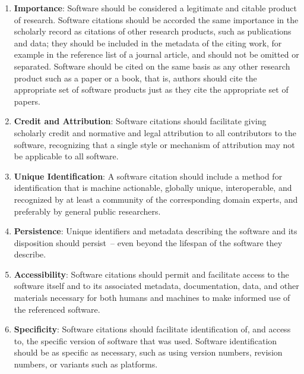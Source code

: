 \documentclass[11pt, oneside]{amsart}
\begin{document}
\begin{enumerate}
\item \textbf{Importance}: \label{principle:importance} Software should be
considered a legitimate and citable product of research. Software citations should
be accorded the same importance in the scholarly record as citations of other
research products, such as publications and data; they should be included in the
metadata of the citing work, for example in the reference list of a journal article,
and should not be omitted or separated.
Software should be cited on the same basis as any other research product such as
a paper or a book, that is, authors should cite the appropriate set of software
products just as they cite the appropriate set of papers.

\item \textbf{Credit and Attribution}: \label{principle:credit}
Software citations should facilitate giving scholarly credit and normative
and legal attribution to all contributors to the software, recognizing
that a single style or mechanism of attribution may not be applicable to
all software.

\item \textbf{Unique Identification}: \label{principle:uid}
A software citation should include a method for identification that is
machine actionable, globally unique, interoperable, and recognized by
at least a community of the corresponding domain experts, and preferably by
general public researchers.

\item \textbf{Persistence}: \label{principle:persistence}
Unique identifiers and metadata describing the software and its disposition
should persist~-- even beyond the lifespan of the software they describe.

\item \textbf{Accessibility}: \label{principle:accessibility} Software citations
should permit and facilitate access to the software itself and to its
associated metadata, documentation, data, and other materials necessary
for both humans and machines to make informed use of the referenced software.

\item \textbf{Specificity}: Software citations should facilitate identification
of, and access to, the specific version of software that was used. Software
identification should be as specific as necessary, such as using version
numbers, revision numbers, or variants such as platforms.
\end{enumerate}
\end{document}
